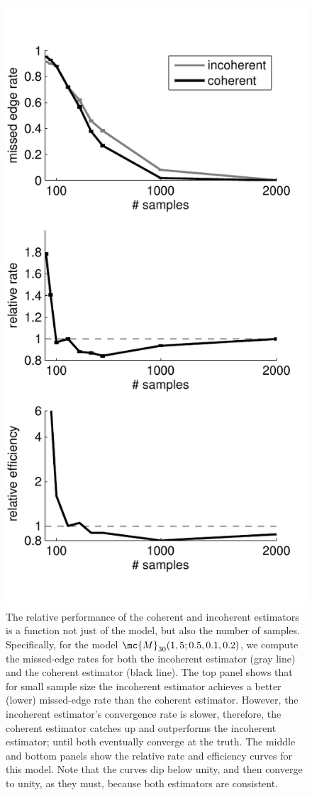 \documentclass[10pt,journal,cspaper,compsoc]{IEEEtran}
\begin{document}
\begin{figure}[htbp]
	\centering
		\includegraphics[width=0.8\linewidth]{../figs/RE_V30_s5_p10_q20.pdf}
	\caption{The relative performance of the coherent and incoherent estimators is a function not just of the model, but also the number of samples.  Specifically, for the model $\mc{M}_{30}(1,5;0.5,0.1,0.2)$, we compute the missed-edge rates for both the incoherent estimator (gray line) and the coherent estimator (black line).  The top panel shows that for small sample size the incoherent estimator achieves a better (lower) missed-edge rate than the coherent estimator. However, the incoherent estimator's convergence rate is slower, therefore, the coherent estimator catches up and outperforms the incoherent estimator; until both eventually converge at the truth.  The middle and bottom panels show the relative rate and efficiency curves for this model. Note that the curves dip below unity, and then converge to unity, as they must, because both estimators are consistent. }
	\label{fig:RE}
\end{figure}
\end{document}
